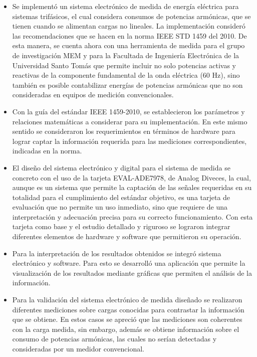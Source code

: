 \begin{itemize}
    \item Se implementó un sistema electrónico de medida de energía eléctrica para sistemas trifásicos, el cual considera consumos de potencias armónicas, que se tienen cuando se alimentan cargas no lineales. La implementación consideró las recomendaciones que se hacen en la norma IEEE STD 1459 del 2010. De esta manera, se cuenta ahora con una herramienta de medida para el grupo de investigación MEM y para la Facultada de Ingeniería Electrónica de la Universidad Santo Tomás que permite incluir no solo potencias activas y reactivas de la componente fundamental de la onda eléctrica (60 Hz), sino también es posible contabilizar energías de potencias armónicas que no son consideradas en equipos de medición convencionales.
    \item Con la guía del estándar IEEE 1459-2010, se establecieron los parámetros y relaciones matemáticas a considerar para su implementación. En este mismo sentido se consideraron los requerimientos en términos de hardware para lograr captar la información requerida para las mediciones correspondientes, indicadas en la norma.
    \item El diseño del sistema electrónico y digital para el sistema de medida se concreto con el uso de la tarjeta EVAL-ADE7978, de Analog Diveces, la cual, aunque es un sistema que permite la captación de las señales requeridas en su totalidad para el cumplimiento del estándar objetivo, es una tarjeta de evaluación que no permite un uso inmediato, sino que requiere de una interpretación y adecuación precisa para su correcto funcionamiento. Con esta tarjeta como base y el estudio detallado y riguroso se lograron integrar diferentes elementos de hardware y software que permitieron su operación.
    \item Para la interpretación de los resultados obtenidos se integró sistema electrónico y software. Para esto se desarrolló una aplicación que permite la visualización de los resultados mediante gráficas que permiten el análisis de la información.
    \item Para la validación del sistema electrónico de medida diseñado se realizaron diferentes mediciones sobre cargas conocidas para contrastar la información que se obtiene. En estos casos se apreció que las mediciones son coherentes con la carga medida, sin embargo, además se obtiene información sobre el consumo de potencias armónicas, las cuales no serían detectadas y consideradas por un medidor convencional.



\end{itemize}
